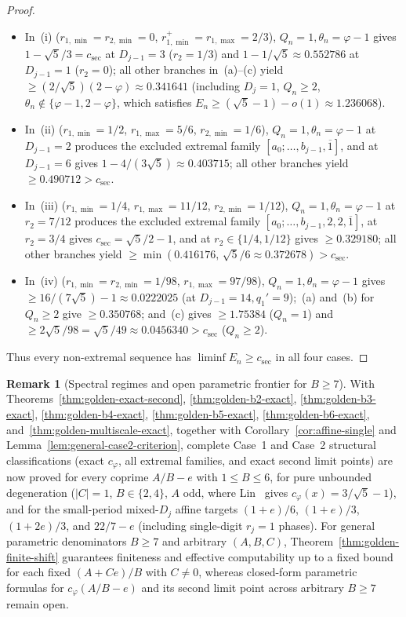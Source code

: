 \documentclass[11pt]{amsart}
\theoremstyle{definition}
\newtheorem{remark}[theorem]{Remark}
\theoremstyle{remark}
\numberwithin{equation}{section}
\begin{document}
\begin{proof}
\begin{itemize}
\item In~(i) ($r_{1,\min}=r_{2,\min}=0$, $r_{1,\min}^+=r_{1,\max}=2/3$),
      $Q_n=1,\theta_n=\varphi-1$ gives $1-\sqrt5/3=c_{\mathrm{sec}}$ at $D_{j-1}=3$
      ($r_2=1/3$) and $1-1/\sqrt5\approx0.552786$ at $D_{j-1}=1$ ($r_2=0$);
      all other branches in~(a)--(c) yield $\ge(2/\sqrt5)(2-\varphi)\approx0.341641$
      (including $D_j=1$, $Q_n\ge2$, $\theta_n\notin\{\varphi-1,2-\varphi\}$,
      which satisfies $E_n\ge(\sqrt5-1)-o(1)\approx1.236068$).
\item In~(ii) ($r_{1,\min}=1/2$, $r_{1,\max}=5/6$, $r_{2,\min}=1/6$),
      $Q_n=1,\theta_n=\varphi-1$ at $D_{j-1}=2$ produces the excluded extremal
      family $[a_0;\ldots,b_{j-1},\overline1]$, and at $D_{j-1}=6$ gives
      $1-4/(3\sqrt5)\approx0.403715$; all other branches yield $\ge0.490712>c_{\mathrm{sec}}$.
\item In~(iii) ($r_{1,\min}=1/4$, $r_{1,\max}=11/12$, $r_{2,\min}=1/12$),
      $Q_n=1,\theta_n=\varphi-1$ at $r_2=7/12$ produces the excluded extremal
      family $[a_0;\ldots,b_{j-1},2,2,\overline1]$, at $r_2=3/4$ gives
      $c_{\mathrm{sec}}=\sqrt5/2-1$, and at $r_2\in\{1/4,1/12\}$ gives $\ge0.329180$;
      all other branches yield $\ge\min(0.416176,\,\sqrt5/6\approx0.372678)>c_{\mathrm{sec}}$.
\item In~(iv) ($r_{1,\min}=r_{2,\min}=1/98$, $r_{1,\max}=97/98$),
      $Q_n=1,\theta_n=\varphi-1$ gives $\ge16/(7\sqrt5)-1\approx0.0222025$
      (at $D_{j-1}=14, q_1'=9$);~(a) and~(b) for $Q_n\ge2$ give $\ge0.350768$;
      and~(c) gives $\ge1.75384$ ($Q_n=1$) and $\ge2\sqrt5/98=\sqrt5/49\approx0.0456340>c_{\mathrm{sec}}$
      ($Q_n\ge2$).
\end{itemize}
Thus every non-extremal sequence has $\liminf E_n\ge c_{\mathrm{sec}}$ in all four cases.
\end{proof}

\begin{remark}[Spectral regimes and open parametric frontier for $B\ge7$]\label{rem:golden-general-regimes}
With Theorems~\ref{thm:golden-exact-second}, \ref{thm:golden-b2-exact},
\ref{thm:golden-b3-exact}, \ref{thm:golden-b4-exact}, \ref{thm:golden-b5-exact},
\ref{thm:golden-b6-exact}, and~\ref{thm:golden-multiscale-exact}, together with
Corollary~\ref{cor:affine-single} and Lemma~\ref{lem:general-case2-criterion},
complete Case~1 and Case~2 structural classifications (exact $c_\varphi$, all
extremal families, and exact second limit points) are now proved for every
coprime $A/B-e$ with $1\le B\le 6$, for pure unbounded degeneration ($|C|=1$,
$B\in\{2,4\}$, $A$ odd, where Lin~\cite[Lemma~4.2]{Lin2018} gives
$c_\varphi(x)=3/\sqrt5-1$), and for the small-period mixed-$D_j$ affine targets
$(1+e)/6$, $(1+e)/3$, $(1+2e)/3$, and $22/7-e$ (including single-digit
$r_j=1$ phases). For general parametric denominators $B\ge7$ and arbitrary
$(A,B,C)$, Theorem~\ref{thm:golden-finite-shift} guarantees finiteness and
effective computability up to a fixed bound for each fixed $(A+Ce)/B$ with $C\ne0$, whereas closed-form parametric
formulas for $c_\varphi(A/B-e)$ and its second limit point across arbitrary
$B\ge7$ remain open.
\end{remark}
\end{document}
